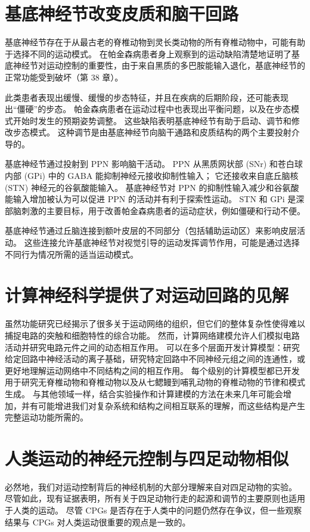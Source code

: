 \section{基底神经节改变皮质和脑干回路}
基底神经节存在于从最古老的脊椎动物到灵长类动物的所有脊椎动物中，可能有助于选择不同的运动模式。 在帕金森病患者身上观察到的运动缺陷清楚地证明了基底神经节对运动控制的重要性，由于来自黑质的多巴胺能输入退化，基底神经节的正常功能受到破坏（第 38 章）。

此类患者表现出缓慢、缓慢的步态特征，并且在疾病的后期阶段，还可能表现出“僵硬”的步态。 帕金森病患者在运动过程中也表现出平衡问题，以及在步态模式开始时发生的预期姿势调整。 这些缺陷表明基底神经节有助于启动、调节和修改步态模式。 这种调节是由基底神经节向脑干通路和皮质结构的两个主要投射介导的。

基底神经节通过投射到 PPN 影响脑干活动。 PPN 从黑质网状部 (SNr) 和苍白球内部 (GPi) 中的 GABA 能抑制神经元接收抑制性输入； 它还接收来自底丘脑核 (STN) 神经元的谷氨酸能输入。 基底神经节对 PPN 的抑制性输入减少和谷氨酸能输入增加被认为可以促进 PPN 的活动并有利于探索性运动。 STN 和 GPi 是深部脑刺激的主要目标，用于改善帕金森病患者的运动症状，例如僵硬和行动不便。

基底神经节通过丘脑连接到额叶皮层的不同部分（包括辅助运动区）来影响皮层活动。 这些连接允许基底神经节对视觉引导的运动发挥调节作用，可能是通过选择不同行为情况所需的适当运动模式。


\section{计算神经科学提供了对运动回路的见解}

虽然功能研究已经揭示了很多关于运动网络的组织，但它们的整体复杂性使得难以捕捉电路的突触和细胞特性的综合功能。 然而，计算网络建模允许人们模拟电路活动并研究电路元件之间的动态相互作用。 可以在多个层面开发计算模型：研究给定回路中神经活动的离子基础，研究特定回路中不同神经元组之间的连通性，或更好地理解运动网络中不同结构之间的相互作用。 每个级别的计算模型都已开发用于研究无脊椎动物和脊椎动物以及从七鳃鳗到哺乳动物的脊椎动物的节律和模式生成。 与其他领域一样，结合实验操作和计算建模的方法在未来几年可能会增加，并有可能增进我们对复杂系统和结构之间相互联系的理解，而这些结构是产生完整运动功能所需的。


\section{人类运动的神经元控制与四足动物相似}

必然地，我们对运动控制背后的神经机制的大部分理解来自对四足动物的实验。 尽管如此，现有证据表明，所有关于四足动物行走的起源和调节的主要原则也适用于人类的运动。 尽管 CPGs 是否存在于人类中的问题仍然存在争议，但一些观察结果与 CPGs 对人类运动很重要的观点是一致的。

